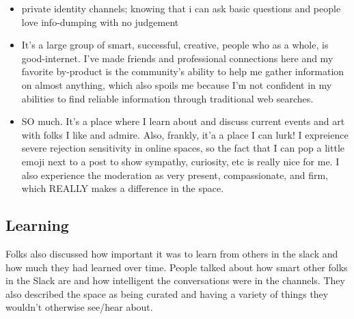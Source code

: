 \documentclass[
]{book}
\begin{document}
\begin{itemize}
\item
  private identity channels; knowing that i can ask basic questions and people love info-dumping with no judgement
\item
  It's a large group of smart, successful, creative, people who as a whole, is good-internet. I've made friends and professional connections here and my favorite by-product is the community's ability to help me gather information on almost anything, which also spoils me because I'm not confident in my abilities to find reliable information through traditional web searches.
\item
  SO much. It's a place where I learn about and discuss current events and art with folks I like and admire. Also, frankly, it'a a place I can lurk! I expreience severe rejection sensitivity in online spaces, so the fact that I can pop a little emoji next to a post to show sympathy, curiosity, etc is really nice for me. I also experience the moderation as very present, compassionate, and firm, which REALLY makes a difference in the space.
\end{itemize}

\subsection{Learning}\label{learning}

Folks also discussed how important it was to learn from others in the slack and how much they had learned over time. People talked about how smart other folks in the Slack are and how intelligent the conversations were in the channels. They also described the space as being curated and having a variety of things they wouldn't otherwise see/hear about.
\end{document}
